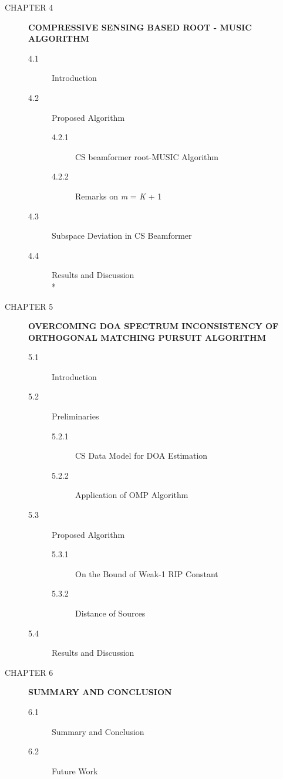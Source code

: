 \documentclass[12pt,a4paper]{article}
\theoremstyle{plain}
\theoremstyle{definition}
\begin{document}
\begin{description}
\item[CHAPTER 4]\textbf{COMPRESSIVE SENSING BASED ROOT - MUSIC ALGORITHM}
\begin{description}
	\item[4.1] Introduction
	\item[4.2] Proposed Algorithm 
		\begin{description}
		\item[4.2.1] CS beamformer root-MUSIC Algorithm
        \item[4.2.2] Remarks on \textit{m} = \textit{K} + 1
		\end{description}
	\item[4.3] Subspace Deviation in CS Beamformer 
    \item[4.4] Results and Discussion\\*\\
\end{description}

\item[CHAPTER 5]  \textbf{OVERCOMING DOA SPECTRUM INCONSISTENCY OF ORTHOGONAL MATCHING PURSUIT ALGORITHM} 
\begin{description}
  \item[5.1] Introduction
  \item[5.2] Preliminaries
  		\begin{description}
		\item[5.2.1] CS Data Model for DOA Estimation
        \item[5.2.2] Application of OMP Algorithm
		\end{description}
  \item[5.3] Proposed Algorithm 
		\begin{description}
		\item[5.3.1] On the Bound of Weak-1 RIP Constant
        \item[5.3.2] Distance of Sources
		\end{description}
  \item[5.4] Results and Discussion
\end{description}

\item[CHAPTER 6] \textbf{SUMMARY AND CONCLUSION}
\begin{description}
	\item[6.1] Summary and Conclusion
	\item[6.2] Future Work
\end{description}

\end{description}
\end{document}
